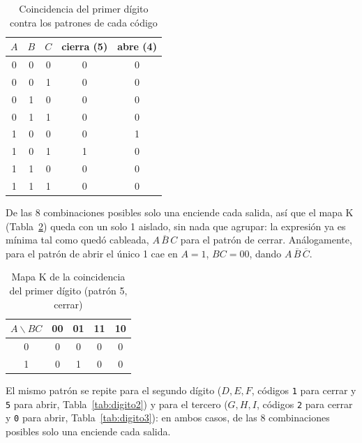 \documentclass[10pt,conference]{IEEEtran}
\begin{document}
	\begin{table}[H]
		\centering
		\caption{Coincidencia del primer d\'igito contra los patrones de cada c\'odigo}
		\label{tab:digito1}
		\begin{tabular}{ccc|cc}
			\toprule
			$A$ & $B$ & $C$ & cierra (5) & abre (4)\\
			\midrule
			0&0&0 & 0&0\\
			0&0&1 & 0&0\\
			0&1&0 & 0&0\\
			0&1&1 & 0&0\\
			1&0&0 & 0&1\\
			1&0&1 & 1&0\\
			1&1&0 & 0&0\\
			1&1&1 & 0&0\\
			\bottomrule
		\end{tabular}
	\end{table}
	
	De las 8 combinaciones posibles solo una enciende cada salida, as\'i que el mapa K
	(Tabla~\ref{tab:kmap_digito1}) queda con un solo 1 aislado, sin nada que agrupar: la expresi\'on ya
	es m\'inima tal como qued\'o cableada, $A\,\overline{B}\,C$ para el patr\'on de cerrar. An\'alogamente,
	para el patr\'on de abrir el \'unico 1 cae en $A=1$, $BC=00$, dando $A\,\overline{B}\,\overline{C}$.
	
	\begin{table}[H]
		\centering
		\caption{Mapa K de la coincidencia del primer d\'igito (patr\'on 5, cerrar)}
		\label{tab:kmap_digito1}
		\begin{tabular}{c|cccc}
			\toprule
			$A\backslash BC$ & 00 & 01 & 11 & 10\\
			\midrule
			0 & 0 & 0 & 0 & 0\\
			1 & 0 & 1 & 0 & 0\\
			\bottomrule
		\end{tabular}
	\end{table}
	
	El mismo patr\'on se repite para el segundo d\'igito ($D,E,F$, c\'odigos \texttt{1} para cerrar y
	\texttt{5} para abrir, Tabla~\ref{tab:digito2}) y para el tercero ($G,H,I$, c\'odigos \texttt{2} para
	cerrar y \texttt{0} para abrir, Tabla~\ref{tab:digito3}): en ambos casos, de las 8 combinaciones
	posibles solo una enciende cada salida.
	
\end{document}
